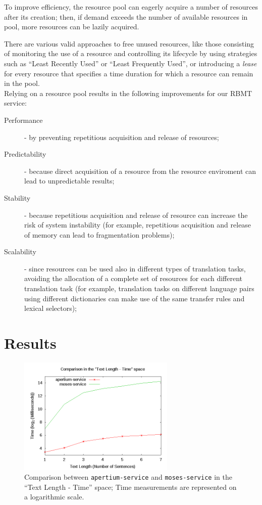 \documentclass[11pt]{article}
\begin{document}
To improve efficiency, the resource pool can eagerly acquire a number of resources after its creation; then, if demand exceeds the number of available resources in pool, more resources can be lazily acquired.

There are various valid approaches to free unused resources, like those consisting of monitoring the use of a resource and controlling its lifecycle by using  strategies such as ``Least Recently Used'' or ``Least Frequently Used'', or introducing a \emph{lease} for every resource that specifies a time duration for which a resource can remain in the pool.\\

Relying on a resource pool results in the following improvements for our RBMT service:

\begin{description}
 \item[Performance] - by preventing repetitious acquisition and release of resources;
 \item[Predictability] - because direct acquisition of a resource from the resource enviroment can lead to unpredictable results;
 \item[Stability] - because repetitious acquisition and release of resource can increase the risk of system instability (for example, repetitious acquisition and release of memory can lead to fragmentation problems);
 \item[Scalability] - since resources can be used also in different types of translation tasks, avoiding the allocation of a complete set of resources for each different translation task (for example, translation tasks on different language pairs using different dictionaries can make use of the same transfer rules and lexical selectors);
\end{description}


\section{Results}

\begin{figure}[!ht]
\begin{center}
\includegraphics[width=7.5cm]{comp}
\end{center}
\caption{Comparison between {\tt apertium-service} and {\tt moses-service} in the ``Text Length - Time'' space; Time measurements are represented on a logarithmic scale.}
\label{fig:comp}
\end{figure}
\end{document}
